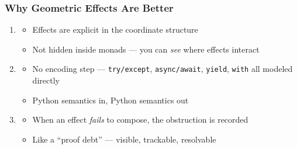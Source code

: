 \begin{frame}
\frametitle{Why Geometric Effects Are Better}
\begin{enumerate}
  \item {}
  \begin{itemize}
    \item Effects are explicit in the coordinate structure
    \item Not hidden inside monads --- you can \emph{see} where effects interact
  \end{itemize}
  \vspace{6pt}
  \item {}
  \begin{itemize}
    \item No encoding step --- \texttt{try/except}, \texttt{async/await},
          \texttt{yield}, \texttt{with} all modeled directly
    \item Python semantics in, Python semantics out
  \end{itemize}
  \vspace{6pt}
  \item {}
  \begin{itemize}
    \item When an effect \emph{fails} to compose, the obstruction is recorded
    \item Like a ``proof debt'' --- visible, trackable, resolvable
  \end{itemize}
\end{enumerate}
\end{frame}

